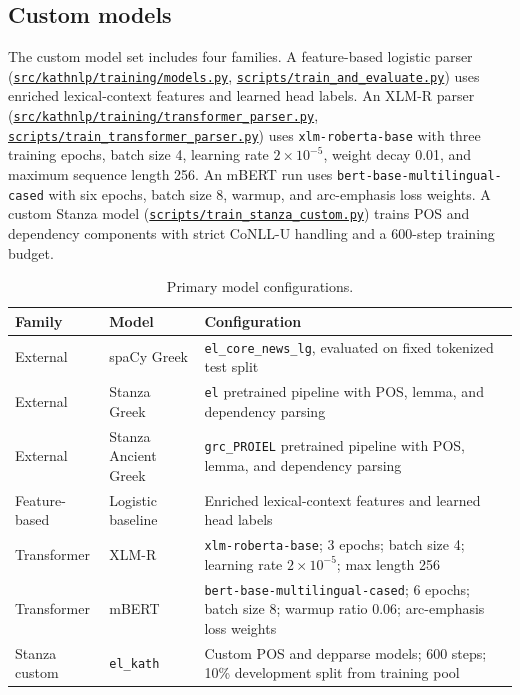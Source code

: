 \documentclass[11pt]{article}
\newcommand{\repobase}{https://github.com/gmikros/katharevousa-nlp-tooling}
\newcommand{\repofile}[1]{\href{\repobase/blob/main/#1}{\nolinkurl{#1}}}
\begin{document}
\subsection{Custom models}

The custom model set includes four families. A feature-based logistic parser (\repofile{src/kathnlp/training/models.py}, \repofile{scripts/train_and_evaluate.py}) uses enriched lexical-context features and learned head labels. An XLM-R parser (\repofile{src/kathnlp/training/transformer_parser.py}, \repofile{scripts/train_transformer_parser.py}) uses \texttt{xlm-roberta-base} with three training epochs, batch size 4, learning rate \(2 \times 10^{-5}\), weight decay 0.01, and maximum sequence length 256. An mBERT run uses \texttt{bert-base-multilingual-cased} with six epochs, batch size 8, warmup, and arc-emphasis loss weights. A custom Stanza model (\repofile{scripts/train_stanza_custom.py}) trains POS and dependency components with strict CoNLL-U handling and a 600-step training budget.

\begin{table}[H]
\centering
\caption{Primary model configurations.}
\label{tab:configs}
\begin{tabular}{p{2.8cm}p{3.0cm}p{7.0cm}}
\toprule
Family & Model & Configuration \\
\midrule
External & spaCy Greek & \texttt{el\_core\_news\_lg}, evaluated on fixed tokenized test split \\
External & Stanza Greek & \texttt{el} pretrained pipeline with POS, lemma, and dependency parsing \\
External & Stanza Ancient Greek & \texttt{grc\_PROIEL} pretrained pipeline with POS, lemma, and dependency parsing \\
Feature-based & Logistic baseline & Enriched lexical-context features and learned head labels \\
Transformer & XLM-R & \texttt{xlm-roberta-base}; 3 epochs; batch size 4; learning rate \(2 \times 10^{-5}\); max length 256 \\
Transformer & mBERT & \texttt{bert-base-multilingual-cased}; 6 epochs; batch size 8; warmup ratio 0.06; arc-emphasis loss weights \\
Stanza custom & \texttt{el\_kath} & Custom POS and depparse models; 600 steps; 10\% development split from training pool \\
\bottomrule
\end{tabular}
\end{table}
\end{document}
